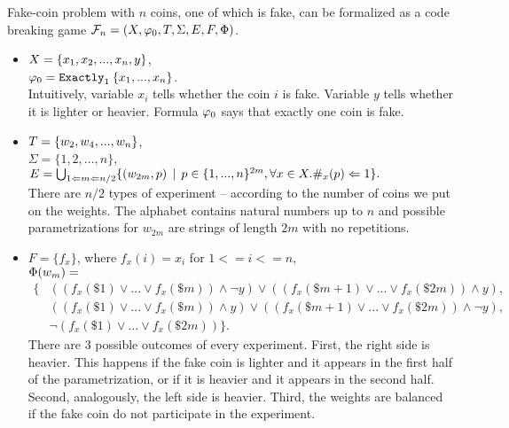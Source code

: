 \begin{example} \label{ex:form-fake-coin1}
Fake-coin problem with $n$ coins, one of which is fake, can be formalized as
a code breaking game
$\mathcal{F}_n = (X, \varphi_0, T, \Sigma, E, F, \Phi)$.

\begin{itemize}
\item
$X = \{x_1, x_2, ..., x_n, y\}$, \\
$\varphi_0 = \mathtt{Exactly}_{1}\:\{x_1, ..., x_n\}$. \\
Intuitively, variable $x_i$ tells whether the coin $i$ is fake.
Variable $y$ tells whether it is lighter or heavier.
Formula $\varphi_0$ says that exactly one coin is fake.

\item
$T = \{ w_2, w_4, ..., w_n \}$, \\
$\Sigma = \{1, 2,...,n\}$, \\
$E = \bigcup_{1<=m<=n/2} \{ (w_{2m}, p) \:\:|\:\:
  p \in \{1,...,n\}^{2m}, \forall x\in X. \#_x(p)<=1 \}. $\\
There are $n/2$ types of experiment -- according to the number of coins we put on the weights.
The alphabet contains natural numbers up to $n$ and
possible parametrizations for $w_{2m}$ are strings of length $2m$ with no repetitions.

\item
$F = \{ f_x \}$, where $f_x(i) = x_i$ for $1 <= i <= n$, \\
$\Phi(w_m) = $ \vspace{-3mm}
\begin{align*}
  \big\{
& ((f_x(\$1) \vee ... \vee f_x(\$m)) \wedge \neg y) \vee ((f_x(\$m+1) \vee ... \vee f_x(\$2m)) \wedge y), \\
& ((f_x(\$1) \vee ... \vee f_x(\$m)) \wedge y) \vee ((f_x(\$m+1) \vee ... \vee f_x(\$2m)) \wedge \neg y), \\
& \neg (f_x(\$1) \vee ... \vee f_x(\$2m)) \big\}.
\end{align*}
There are 3 possible outcomes of every experiment.
First, the right side is heavier. This happens if the fake coin is lighter and it appears in the first half of the parametrization, or if it is heavier and it appears in the second half. Second, analogously, the left side is heavier.
Third, the weights are balanced if the fake coin do not participate in the experiment. \eqed
\end{itemize}
\end{example}

